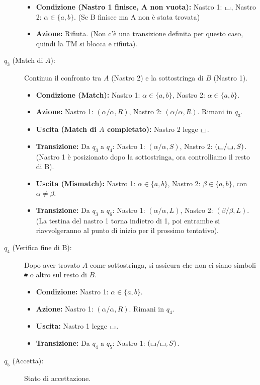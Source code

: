 \documentclass[a4paper]{article}
\theoremstyle{definition} %
\newcommand{\blankS}{\ensuremath{\raisebox{-0.15ex}{\scalebox{1.3}[0.7]{$\sqcup$}}}}
\begin{document}
\begin{description}
\begin{itemize}
        \item \textbf{Condizione (Nastro 1 finisce, A non vuota):} Nastro 1: $\blankS$, Nastro 2: $\alpha \in \{a,b\}$. (Se B finisce ma A non è stata trovata)
        \item \textbf{Azione:} Rifiuta. (Non c'è una transizione definita per questo caso, quindi la TM si blocca e rifiuta).
    \end{itemize}
    \item[$q_3$ (Match di $A$):] Continua il confronto tra $A$ (Nastro 2) e la sottostringa di $B$ (Nastro 1).
    \begin{itemize}
        \item \textbf{Condizione (Match):} Nastro 1: $\alpha \in \{a,b\}$, Nastro 2: $\alpha \in \{a,b\}$.
        \item \textbf{Azione:} Nastro 1: $(\alpha/\alpha, R)$, Nastro 2: $(\alpha/\alpha, R)$. Rimani in $q_3$.
        \item \textbf{Uscita (Match di $A$ completato):} Nastro 2 legge $\blankS$.
        \item \textbf{Transizione:} Da $q_3$ a $q_4$: Nastro 1: $(\alpha/\alpha, S)$, Nastro 2: $(\blankS/\blankS, S)$. (Nastro 1 è posizionato dopo la sottostringa, ora controlliamo il resto di B).
        \item \textbf{Uscita (Mismatch):} Nastro 1: $\alpha \in \{a,b\}$, Nastro 2: $\beta \in \{a,b\}$, con $\alpha \ne \beta$.
        \item \textbf{Transizione:} Da $q_3$ a $q_6$: Nastro 1: $(\alpha/\alpha, L)$, Nastro 2: $(\beta/\beta, L)$. (La testina del nastro 1 torna indietro di 1, poi entrambe si riavvolgeranno al punto di inizio per il prossimo tentativo).
    \end{itemize}
    \item[$q_4$ (Verifica fine di B):] Dopo aver trovato $A$ come sottostringa, si assicura che non ci siano simboli \texttt{\#} o altro sul resto di $B$.
    \begin{itemize}
        \item \textbf{Condizione:} Nastro 1: $\alpha \in \{a,b\}$.
        \item \textbf{Azione:} Nastro 1: $(\alpha/\alpha, R)$. Rimani in $q_4$.
        \item \textbf{Uscita:} Nastro 1 legge $\blankS$.
        \item \textbf{Transizione:} Da $q_4$ a $q_5$: Nastro 1: $(\blankS/\blankS, S)$.
    \end{itemize}
    \item[$q_5$ (Accetta):] Stato di accettazione.

\end{description}
\end{document}
